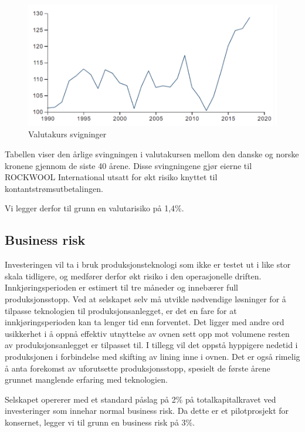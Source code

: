 \begin{figure}[H]
  \includegraphics[width=\linewidth]{bilder/valutahistorikk.png}
  \caption{Valutakurs svigninger}
  \label{fig:valutahistorikk}
\end{figure}

Tabellen viser den årlige svingningen i valutakursen mellom den danske og norske kronene gjennom de siste 40 årene. Disse svingningene gjør eierne til ROCKWOOL International utsatt for økt risiko knyttet til kontantstrømsutbetalingen.  

\indent \newline
Vi legger derfor til grunn en valutarisiko på 1,4\%.

\subsection{Business risk}
Investeringen vil ta i bruk produksjonsteknologi som ikke er testet ut i like stor skala tidligere, og medfører derfor økt risiko i den operasjonelle driften. Innkjøringsperioden er estimert til tre måneder og innebærer full produksjonsstopp. Ved at selskapet selv må utvikle nødvendige løsninger for å tilpasse teknologien til produksjonsanlegget, er det en fare for at innkjøringsperioden kan ta lenger tid enn forventet. Det ligger med andre ord usikkerhet i å oppnå effektiv utnyttelse av ovnen sett opp mot volumene resten av produksjonsanlegget er tilpasset til. I tillegg vil det oppstå hyppigere nedetid i produksjonen i forbindelse med skifting av lining inne i ovnen. Det er også rimelig å anta forekomst av uforutsette produksjonsstopp, spesielt de første årene grunnet manglende erfaring med teknologien.

\indent \newline
Selskapet opererer med et standard påslag på 2\% på totalkapitalkravet ved investeringer som innehar normal business risk. Da dette er et pilotprosjekt for konsernet, legger vi til grunn en business risk på 3\%.

